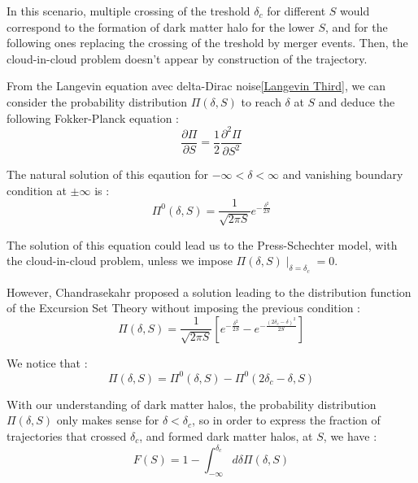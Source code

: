 In this scenario, multiple crossing of the treshold $\delta_c$ for different $S$ would correspond to the formation of dark matter halo for the lower $S$, and for the following ones replacing the crossing of the treshold by merger events. Then, the cloud-in-cloud problem doesn't appear by construction of the trajectory.

From the Langevin equation avec delta-Dirac noise\ref{Langevin Third}, we can consider the probability distribution $\Pi (\delta, S)$ to reach $\delta$ at $S$ and deduce the following Fokker-Planck equation :
\begin{equation}
\label{Fokker-Planck}
\frac{\partial \Pi}{\partial S} = \frac{1}{2} \frac{\partial^2 \Pi}{\partial S^2}
\end{equation}

The natural solution of this eqaution for $-\infty < \delta < \infty$ and vanishing boundary condition at $\pm \infty$ is :
\begin{equation}
\label{Sol Fokker}
\Pi^0(\delta, S) = \frac{1}{\sqrt{2\pi S}} e^{-\frac{\delta^2}{2S}}
\end{equation}

The solution of this equation could lead us to the Press-Schechter model, with the cloud-in-cloud problem, unless we impose $\Pi (\delta, S) \mid_{\delta = \delta_c} = 0$.

However, Chandrasekahr proposed a solution\cite{Chandrasekhar} leading to the distribution function of the Excursion Set Theory without imposing the previous condition :
\begin{equation}
\label{Chandrasekhar Equation}
\Pi (\delta, S) = \frac{1}{\sqrt{2\pi S}} \left[e^{-\frac{\delta^2}{2S}} - e^{-\frac{(2\delta_c - \delta)^2}{2S}} \right]
\end{equation}

We notice that :
\begin{equation}
\Pi (\delta, S) = \Pi^0(\delta,S) - \Pi^0(2\delta_c - \delta, S)
\end{equation}

With our understanding of dark matter halos, the probability distribution $\Pi(\delta, S)$ only makes sense for $\delta < \delta_c$, so in order to express the fraction of trajectories that crossed $\delta_c$, and formed dark matter halos, at $S$, we have :
\begin{equation}
\label{Frac}
F(S) = 1 - \int^{\delta_c}_{-\infty} d\delta \Pi (\delta, S)
\end{equation}

